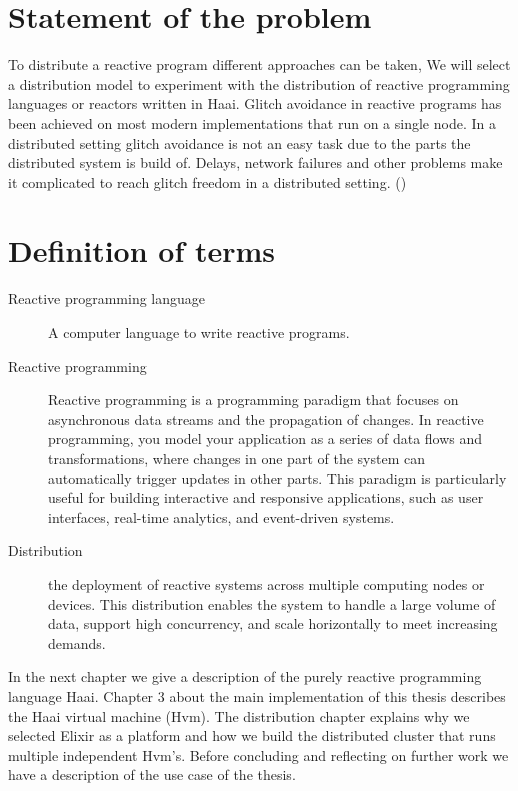 \documentclass[a4paper]{book}
\begin{document}
\section{Statement of the problem}
To distribute a reactive program different approaches can be taken, We will select a distribution model to experiment with the distribution of reactive programming languages or reactors written in Haai. Glitch avoidance in reactive programs has been achieved on most modern implementations that run on a single node. In a distributed setting glitch avoidance is not an easy task due to the parts the distributed system is build of. Delays, network failures and other problems make it complicated to reach glitch freedom in a distributed setting. (\cite{DBLP:journals/csur/BainomugishaCCMM13})

\section{Definition of terms}
\begin{description}
	\item[Reactive programming language] A computer language to write reactive programs.
	\item[Reactive programming] Reactive programming is a programming paradigm that focuses on asynchronous data streams and the propagation of changes. In reactive programming, you model your application as a series of data flows and transformations, where changes in one part of the system can automatically trigger updates in other parts. This paradigm is particularly useful for building interactive and responsive applications, such as user interfaces, real-time analytics, and event-driven systems.
	\item[Distribution] the deployment of reactive systems across multiple computing nodes or devices. This distribution enables the system to handle a large volume of data, support high concurrency, and scale horizontally to meet increasing demands.
\end{description}


In the next chapter we give a description of the purely reactive programming language Haai. Chapter 3 about the main implementation of this thesis describes the Haai virtual machine (Hvm). The distribution chapter explains why we selected Elixir as a platform and how we build the distributed cluster that runs multiple independent Hvm's. Before concluding and reflecting on further work we have a description of the use case of the thesis. 
\end{document}
